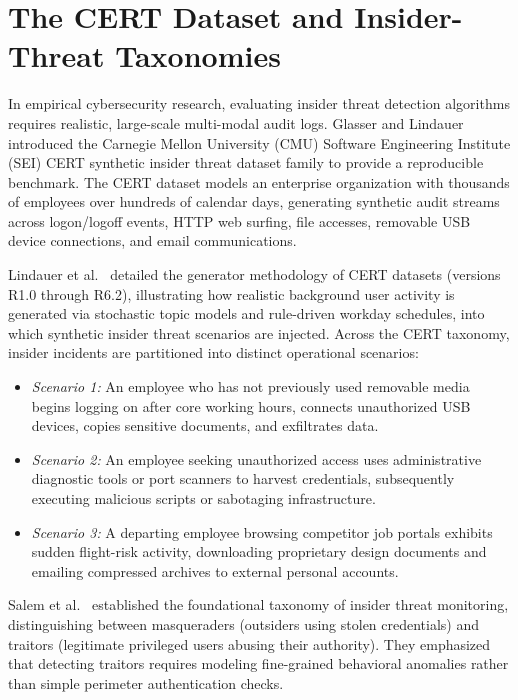 \documentclass[12pt,a4paper]{report}
\begin{document}
\section{The CERT Dataset and Insider-Threat Taxonomies}
In empirical cybersecurity research, evaluating insider threat detection algorithms requires realistic, large-scale multi-modal audit logs. Glasser and Lindauer~\cite{glasser2013bridging} introduced the Carnegie Mellon University (CMU) Software Engineering Institute (SEI) CERT synthetic insider threat dataset family to provide a reproducible benchmark. The CERT dataset models an enterprise organization with thousands of employees over hundreds of calendar days, generating synthetic audit streams across logon/logoff events, HTTP web surfing, file accesses, removable USB device connections, and email communications. 

Lindauer et al.~\cite{lindauer2020generating} detailed the generator methodology of CERT datasets (versions R1.0 through R6.2), illustrating how realistic background user activity is generated via stochastic topic models and rule-driven workday schedules, into which synthetic insider threat scenarios are injected. Across the CERT taxonomy, insider incidents are partitioned into distinct operational scenarios:
\begin{itemize}
    \item \textit{Scenario 1:} An employee who has not previously used removable media begins logging on after core working hours, connects unauthorized USB devices, copies sensitive documents, and exfiltrates data.
    \item \textit{Scenario 2:} An employee seeking unauthorized access uses administrative diagnostic tools or port scanners to harvest credentials, subsequently executing malicious scripts or sabotaging infrastructure.
    \item \textit{Scenario 3:} A departing employee browsing competitor job portals exhibits sudden flight-risk activity, downloading proprietary design documents and emailing compressed archives to external personal accounts.
\end{itemize}
Salem et al.~\cite{salem2008survey} established the foundational taxonomy of insider threat monitoring, distinguishing between masqueraders (outsiders using stolen credentials) and traitors (legitimate privileged users abusing their authority). They emphasized that detecting traitors requires modeling fine-grained behavioral anomalies rather than simple perimeter authentication checks.
\end{document}
